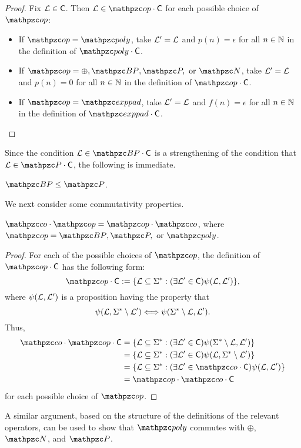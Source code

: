 \begin{proof}
Fix $\mathcal{L}\in\mathsf{C}$. Then $\cL\in\op\cdot\sC$ for each possible choice of $\op$:
\begin{itemize}
\item If $\op=\cpoly$, take $\mathcal{L}^\prime=\mathcal{L}$ and $p(n)=\epsilon$ for all $n\in\mathbb{N}$
  in the definition of $\cpoly\cdot\sC$.
\item If $\op=\oplus,\cBP,\cP,\text{ or }\cN$, take $\mathcal{L}^\prime=\mathcal{L}$ and
  $p(n)=0$ for all $n\in\mathbb{N}$ in the definition of $\op\cdot\sC$.
\item If $\op=\exppad$, take $\mathcal{L}^\prime=\mathcal{L}$ and $f(n)=\epsilon$ for all
  $n\in\mathbb{N}$ in the definition of $\exppad\cdot\sC$.
\end{itemize}
\end{proof}
Since the condition $\cL\in\cBP\cdot\sC$ is a strengthening of the condition that
$\cL\in\cP\cdot\sC$, the following is immediate.
\begin{proposition}
$\cBP\leq\cP$.
\end{proposition}

We next consider some commutativity properties.

\begin{proposition}
$\cco\cdot\op=\op\cdot\cco$, where $\op=\cBP,\cP,\text{ or }\cpoly$.
\end{proposition}

\begin{proof}
For each of the possible choices of $\op$, the definition of $\op\cdot\sC$ has
the following form:
\[
\op\cdot\sC:=\{\cL\subseteq\Sigma^*:(\exists\cL^\prime\in\sC)
\psi(\cL,\cL^\prime)\},
\]
where $\psi(\mathcal{L},\mathcal{L}^\prime)$ is a proposition having the property that
\[
\psi(\mathcal{L},\Sigma^*\setminus\mathcal{L}^\prime)\Longleftrightarrow
\psi(\Sigma^*\setminus\mathcal{L},\mathcal{L}^\prime).
\]
Thus,
\begin{align*}
\cco\cdot\op\cdot\sC
&=\{\cL\subseteq\Sigma^*:(\exists\cL^\prime\in\sC)\psi(\Sigma^*\setminus\cL,\cL^\prime)\} \\
&=\{\cL\subseteq\Sigma^*:(\exists\cL^\prime\in\sC)
\psi(\cL,\Sigma^*\setminus\cL^\prime)\} \\
&=\{\cL\subseteq\Sigma^*:(\exists\cL^\prime\in\cco\cdot\sC)
\psi(\cL,\cL^\prime)\} \\
&=\op\cdot\cco\cdot\sC
\end{align*}
for each possible choice of $\op$.
\end{proof}
A similar argument, based on the structure of the definitions of the relevant
operators, can be used to show that $\cpoly$ commutes with $\oplus$, $\cN$, and
$\cP$.

